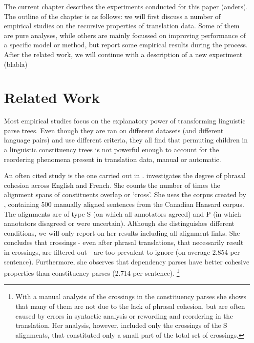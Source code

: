 \documentclass{report}
\theoremstyle{definition}
\theoremstyle{plain}
\begin{document}
The current chapter describes the experiments conducted for this paper (anders). The outline of the chapter is as follows: we will first discuss a number of empirical studies on the recursive properties of translation data. Some of them are pure analyses, while others are mainly focussed on improving performance of a specific model or method, but report some empirical results during the process. After the related work, we will continue with a description of a new experiment (blabla)


\section{Related Work}


Most empirical studies focus on the explanatory power of transforming linguistic parse trees. Even though they are ran on different datasets (and different language pairs) and use different criteria, they all find that permuting children in a linguistic constituency trees is not powerful enough to account for the reordering phenomena present in translation data, manual or automatic.

An often cited study is the one carried out in \cite{fox2002phrasal}. \citeauthor{fox2002phrasal} investigates the degree of phrasal cohesion across English and French. She counts the number of times the alignment spans of constituents overlap or `cross'. She uses the corpus created by \cite{och2000improved}, containing 500 manually aligned sentences from the Canadian Hansard corpus. The alignments are of type S (on which all annotators agreed) and P (in which annotators disagreed or were uncertain). Although she distinguishes different conditions, we will only report on her results including all alignment links. She concludes that crossings - even after phrasal translations, that necessarily result in crossings, are filtered out - are too prevalent to ignore (on average 2.854 per sentence). Furthermore, she observes that dependency parses have better cohesive properties than constituency parses (2.714 per sentence). \footnote{With a manual analysis of the crossings in the constituency parses she shows that many of them are not due to the lack of phrasal cohesion, but are often caused by errors in syntactic analysis or rewording and reordering in the translation. Her analysis, however, included only the crossings of the S alignments, that constituted only a small part of the total set of crossings.}
\end{document}
